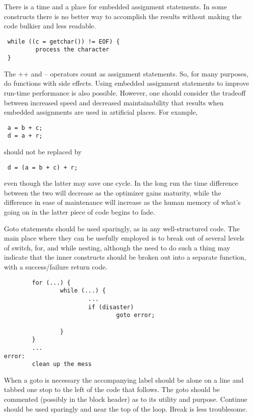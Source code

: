  There is a time and a place for embedded assignment statements. In some
constructs there is no better way to accomplish the results without making the
code bulkier and less readable.

\begin{verbatim}
 while ((c = getchar()) != EOF) {
         process the character
 }
\end{verbatim}

The {\cd ++} and {\cd --} operators count as assignment statements. So, for many purposes,
do functions with side effects. Using embedded assignment statements to
improve run-time performance is also possible. However, one should consider
the tradeoff between increased speed and decreased maintainability that results
when embedded assignments are used in artificial places. For example, 
\begin{verbatim}
 a = b + c;
 d = a + r; 
\end{verbatim}
should not be replaced by 
\begin{verbatim}
 d = (a = b + c) + r; 
\end{verbatim}
even though the latter may save one cycle. In the long run the time difference
between the two will decrease as the optimizer gains maturity, while the
difference in ease of maintenance will increase as the human memory of what's
going on in the latter piece of code begins to fade. 

 Goto statements should be used sparingly, as in any well-structured code. The
main place where they can be usefully employed is to break out of several
levels of switch, for, and while nesting, although the need to do such a thing
may indicate that the inner constructs should be broken out into a separate
function, with a success/failure return code. 

\begin{verbatim}
        for (...) {
                while (...) {
                        ...
                        if (disaster)
                                goto error; 

                }
        }
        ...
error:
        clean up the mess 
\end{verbatim}

When a goto is necessary the accompanying label should be alone on a line and
tabbed one stop to the left of the code that follows. The goto should be
commented (possibly in the block header) as to its utility and purpose.
Continue should be used sparingly and near the top of the loop. Break is less
troublesome. 

